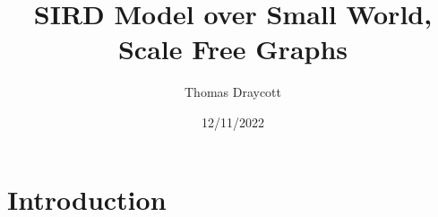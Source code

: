 \documentclass{article}
\title{SIRD Model over Small World, Scale Free Graphs}
\date{12/11/2022}
\author{Thomas Draycott}
\begin{document}
    \maketitle
    \newpage
    \section{Introduction}
    
    
    
    
    
\end{document}
